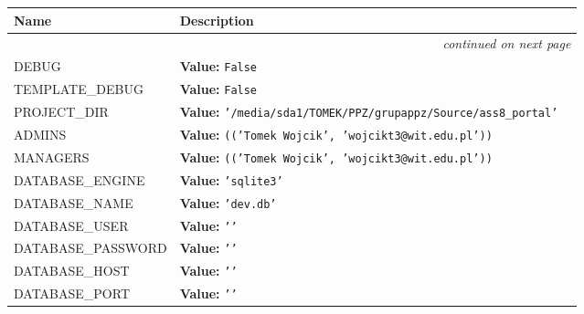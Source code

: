     \vspace{-1cm}
\hspace{\varindent}\begin{longtable}{|p{\varnamewidth}|p{\vardescrwidth}|l}
\cline{1-2}
\cline{1-2} \centering \textbf{Name} & \centering \textbf{Description}& \\
\cline{1-2}
\endhead\cline{1-2}\multicolumn{3}{r}{\small\textit{continued on next page}}\\\endfoot\cline{1-2}
\endlastfoot\raggedright D\-E\-B\-U\-G\- & \raggedright \textbf{Value:} 
{\tt False}&\\
\cline{1-2}
\raggedright T\-E\-M\-P\-L\-A\-T\-E\-\_\-D\-E\-B\-U\-G\- & \raggedright \textbf{Value:} 
{\tt False}&\\
\cline{1-2}
\raggedright P\-R\-O\-J\-E\-C\-T\-\_\-D\-I\-R\- & \raggedright \textbf{Value:} 
{\tt \texttt{'}\texttt{/media/sda1/TOMEK/PPZ/grupappz/Source/ass8\_portal}\texttt{'}}&\\
\cline{1-2}
\raggedright A\-D\-M\-I\-N\-S\- & \raggedright \textbf{Value:} 
{\tt \texttt{(}\texttt{(}\texttt{'}\texttt{Tomek Wojcik}\texttt{'}\texttt{, }\texttt{'}\texttt{wojcikt3@wit.edu.pl}\texttt{'}\texttt{)}\texttt{)}}&\\
\cline{1-2}
\raggedright M\-A\-N\-A\-G\-E\-R\-S\- & \raggedright \textbf{Value:} 
{\tt \texttt{(}\texttt{(}\texttt{'}\texttt{Tomek Wojcik}\texttt{'}\texttt{, }\texttt{'}\texttt{wojcikt3@wit.edu.pl}\texttt{'}\texttt{)}\texttt{)}}&\\
\cline{1-2}
\raggedright D\-A\-T\-A\-B\-A\-S\-E\-\_\-E\-N\-G\-I\-N\-E\- & \raggedright \textbf{Value:} 
{\tt \texttt{'}\texttt{sqlite3}\texttt{'}}&\\
\cline{1-2}
\raggedright D\-A\-T\-A\-B\-A\-S\-E\-\_\-N\-A\-M\-E\- & \raggedright \textbf{Value:} 
{\tt \texttt{'}\texttt{dev.db}\texttt{'}}&\\
\cline{1-2}
\raggedright D\-A\-T\-A\-B\-A\-S\-E\-\_\-U\-S\-E\-R\- & \raggedright \textbf{Value:} 
{\tt \texttt{'}\texttt{}\texttt{'}}&\\
\cline{1-2}
\raggedright D\-A\-T\-A\-B\-A\-S\-E\-\_\-P\-A\-S\-S\-W\-O\-R\-D\- & \raggedright \textbf{Value:} 
{\tt \texttt{'}\texttt{}\texttt{'}}&\\
\cline{1-2}
\raggedright D\-A\-T\-A\-B\-A\-S\-E\-\_\-H\-O\-S\-T\- & \raggedright \textbf{Value:} 
{\tt \texttt{'}\texttt{}\texttt{'}}&\\
\cline{1-2}
\raggedright D\-A\-T\-A\-B\-A\-S\-E\-\_\-P\-O\-R\-T\- & \raggedright \textbf{Value:} 
{\tt \texttt{'}\texttt{}\texttt{'}}&\\

\end{longtable}
